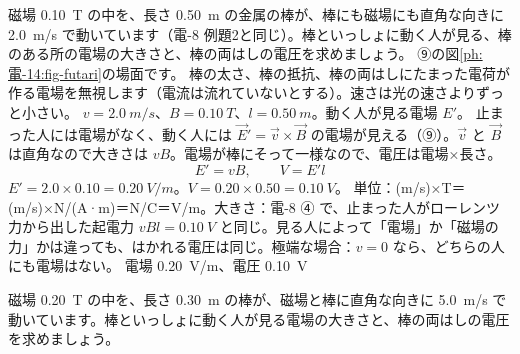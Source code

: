 \begin{phreidai}[棒といっしょに動く人が見る電場]
\label{ph:電-14:ex8}磁場 \qty{0.10}{T} の中を、長さ \qty{0.50}{m} の金属の棒が、棒にも磁場にも直角な向きに \qty{2.0}{m/s} で動いています（電-8 例題2と同じ）。棒といっしょに動く人が見る、棒のある所の電場の大きさと、棒の両はしの電圧を求めましょう。
\phbamen
⑨の図\ref{ph:電-14:fig-futari}の場面です。
\phmushi
棒の太さ、棒の抵抗、棒の両はしにたまった電荷が作る電場を無視します（電流は流れていないとする）。速さは光の速さよりずっと小さい。
\phzu
$v=\qty{2.0}{m/s}$、$B=\qty{0.10}{T}$、$l=\qty{0.50}{m}$。動く人が見る電場 $E'$。
\phriyu
止まった人には電場がなく、動く人には $\vec E'=\vec v\times\vec B$ の電場が見える（⑨）。$\vec v$ と $\vec B$ は直角なので大きさは $vB$。電場が棒にそって一様なので、電圧は電場×長さ。
\phtateru
\[ E'=vB,\qquad V=E'l \]
\phtoku
$E'=2.0\times0.10=\qty{0.20}{V/m}$。$V=0.20\times0.50=\qty{0.10}{V}$。
\phtashikame
単位：(m/s)×T＝(m/s)×N/(A·m)＝N/C＝V/m。大きさ：電-8 ④ で、止まった人がローレンツ力から出した起電力 $vBl=\qty{0.10}{V}$ と同じ。見る人によって「電場」か「磁場の力」かは違っても、はかれる電圧は同じ。極端な場合：$v=0$ なら、どちらの人にも電場はない。
\kotae 電場 \qty{0.20}{V/m}、電圧 \qty{0.10}{V}
\end{phreidai}
\begin{jibun}
磁場 \qty{0.20}{T} の中を、長さ \qty{0.30}{m} の棒が、磁場と棒に直角な向きに \qty{5.0}{m/s} で動いています。棒といっしょに動く人が見る電場の大きさと、棒の両はしの電圧を求めましょう。
\end{jibun}

